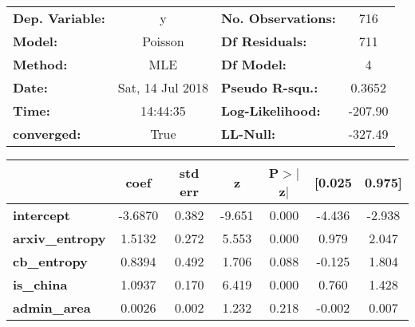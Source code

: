 \documentclass{report}
\begin{document}
\begin{center}
\begin{tabular}{lclc}
\toprule
\textbf{Dep. Variable:} &        y         & \textbf{  No. Observations:  } &      716    \\
\textbf{Model:}         &     Poisson      & \textbf{  Df Residuals:      } &      711    \\
\textbf{Method:}        &       MLE        & \textbf{  Df Model:          } &        4    \\
\textbf{Date:}          & Sat, 14 Jul 2018 & \textbf{  Pseudo R-squ.:     } &   0.3652    \\
\textbf{Time:}          &     14:44:35     & \textbf{  Log-Likelihood:    } &   -207.90   \\
\textbf{converged:}     &       True       & \textbf{  LL-Null:           } &   -327.49   \\
\bottomrule
\end{tabular}
\begin{tabular}{lcccccc}
                        & \textbf{coef} & \textbf{std err} & \textbf{z} & \textbf{P$>$$|$z$|$} & \textbf{[0.025} & \textbf{0.975]}  \\
\midrule
\textbf{intercept}      &      -3.6870  &        0.382     &    -9.651  &         0.000        &       -4.436    &       -2.938     \\
\textbf{arxiv\_entropy} &       1.5132  &        0.272     &     5.553  &         0.000        &        0.979    &        2.047     \\
\textbf{cb\_entropy}    &       0.8394  &        0.492     &     1.706  &         0.088        &       -0.125    &        1.804     \\
\textbf{is\_china}      &       1.0937  &        0.170     &     6.419  &         0.000        &        0.760    &        1.428     \\
\textbf{admin\_area}    &       0.0026  &        0.002     &     1.232  &         0.218        &       -0.002    &        0.007     \\
\bottomrule
\end{tabular}
\end{center}
\end{document}
